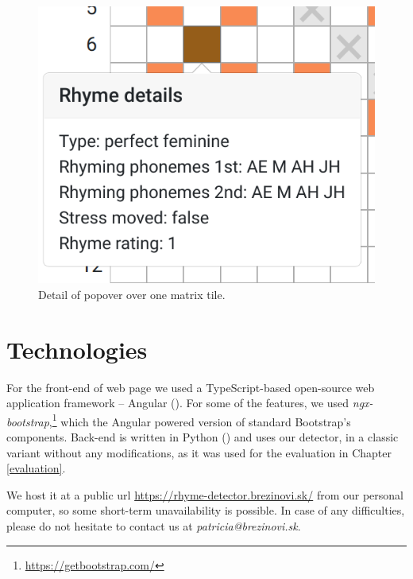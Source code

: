 \begin{figure}[h]\centering
		\includegraphics[scale=0.45]{../img/popover-detail.png}
	\caption{Detail of popover over one matrix tile.}
	\label{web-popover}
\end{figure}


\section{Technologies}
For the front-end of web page we used a TypeScript-based open-source web application framework --  Angular (\cite{jain2014angularjs}). For some of the features, we used \textit{ngx-bootstrap},\footnote{\url{https://getbootstrap.com/}} which the Angular powered version of standard Bootstrap's components. Back-end is written in Python (\cite{van1995python}) and uses our detector, in a classic variant without any modifications, as it was used for the evaluation in Chapter \ref{evaluation}.

We host it at a public url \url{https://rhyme-detector.brezinovi.sk/} from our personal computer, so some short-term unavailability is possible. In case of any difficulties, please do not hesitate to contact us at \textit{patricia@brezinovi.sk}.